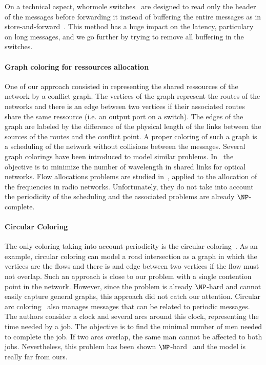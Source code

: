 On a technical aspect, whormole switches~\cite{cole1996benefit} are designed to read only the header of the messages before forwarding it instead of buffering the entire messages as in store-and-forward~\cite{tindell1992store}. This method has a huge impact on the latency, particulary on long messages, and we go further by trying to remove all buffering in the switches.


\paragraph{Graph coloring for ressources allocation}

One of our approach consisted in representing the shared ressources of the network by a conflict graph. The vertices of the graph represent the routes of the networks and there is an edge between two vertices if their associated routes share the same ressource (i.e. an output port on a switch). The edges of the graph are labeled by the difference of the physical length of the links between the sources of the routes and the conflict point. A proper coloring of such a graph is a scheduling of the network without collisions between the messages. Several graph colorings have been introduced to model similar problems. In~\cite{erlebach2001complexity} the objective is to minimize the number of wavelength in shared links for optical networks. Flow allocations problems are studied in~\cite{borndorfer1998frequency}, applied to the allocation of the frequencies in radio networks. Unfortunately, they do not take into account the periodicity of the scheduling and the associated problems are already $\NP$-complete. 

\paragraph{Circular Coloring}
The only coloring taking into account periodicity is the circular coloring~\cite{ZHU2001371,zhou2013multiple}. As an example, circular coloring can model a road intersection as a graph in which the vertices are the flows and there is and edge between two vertices if the flow must not overlap. Such an approach is close to our problem with a single contention point in the network. However, since the problem is already $\NP$-hard and cannot easily capture general graphs, this approach did not catch our attention.
Circular arc coloring~\cite{10.2307/2100446} also manages messages that can be related to periodic messages. The authors consider a clock and several arcs around this clock, representing the time needed by a job. The objective is to find the minimal number of men needed to complete the job. If two arcs overlap, the same man cannot be affected to both jobs. Nevertheless, this problem has been shown $\NP$-hard~\cite{10.1007/BFb0053971} and the model is really far from ours.

